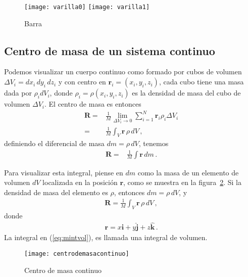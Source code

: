 \begin{frame}
  \begin{figure}
    \centering
{\texttt{[image: varilla0]}}
{\texttt{[image: varilla1]}}
    \caption{Barra}
    \label{fig:varilla}
  \end{figure}
\end{frame}

\subsection{Centro de masa de un sistema continuo}
Podemos visualizar un cuerpo continuo como formado por cubos de
volumen $\Delta V_i=dx_i\,dy_i\,dz_i$ y con centro en
$\mathbf{r}_{i}=(x_i,y_i,z_i)$, cada cubo tiene una masa dada por
$\rho_i dV_i$, donde $\rho_i=\rho(x_i,y_i,z_i)$ es la densidad de masa
del cubo de volumen $\Delta V_i$.
El centro de masa es entonces
\begin{align}
  \mathbf{R}=&\frac{1}{M}\lim_{\Delta V_i\to 0}\sum_{i=1}^N \mathbf{r}_i \rho_i \Delta V_i \nonumber\\
 =&\frac{1}{M}\int_V \mathbf{r}\,\rho\,dV\,, 
\end{align}
definiendo el diferencial de masa $dm=\rho\,dV$, tenemos
\begin{align}
  \mathbf{R}=&\frac{1}{M}\int \mathbf{r}\, dm\,.
\end{align}

Para visualizar esta integral, piense en $dm$ como la masa de un elemento de volumen $dV$ localizada en la posición $\mathbf{r}$, como se muestra en la figura~\ref{fig:centrodemasacontinuo}. Si la densidad de masa del elemento es $\rho$, entonces $dm=\rho\,dV$, y
\begin{align}
\label{eq:mintvol}
  \mathbf{R}=\frac{1}{M}\int_V \mathbf{r}\,\rho\,dV\,, 
\end{align}
donde
\begin{align}
  \mathbf{r}=x\hat{\mathbf{i}}+y\hat{\mathbf{j}}+z\hat{\mathbf{k}}\,.
\end{align}
La integral en (\ref{eq:mintvol}), es llamada una integral de volumen.

\begin{frame}
  \begin{figure}
  \centering
  \texttt{[image: centrodemasacontinuo]}
  \caption{Centro de masa continuo}
  \label{fig:centrodemasacontinuo}
\end{figure}
\end{frame}

